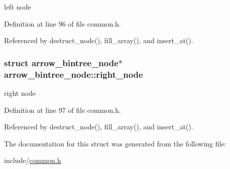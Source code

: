 left node 

Definition at line 96 of file common.h.

Referenced by destruct\_\-node(), fill\_\-array(), and insert\_\-at().\hypertarget{structarrow__bintree__node_4875801983f2b0220212951e6c0130af}{
\subsubsection[{right\_\-node}]{\setlength{\rightskip}{0pt plus 5cm}struct {\bf arrow\_\-bintree\_\-node}$\ast$ {\bf arrow\_\-bintree\_\-node::right\_\-node}}}
\label{structarrow__bintree__node_4875801983f2b0220212951e6c0130af}


right node 

Definition at line 97 of file common.h.

Referenced by destruct\_\-node(), fill\_\-array(), and insert\_\-at().

The documentation for this struct was generated from the following file:\begin{CompactItemize}
\item 
include/\hyperlink{common_8h}{common.h}\end{CompactItemize}
